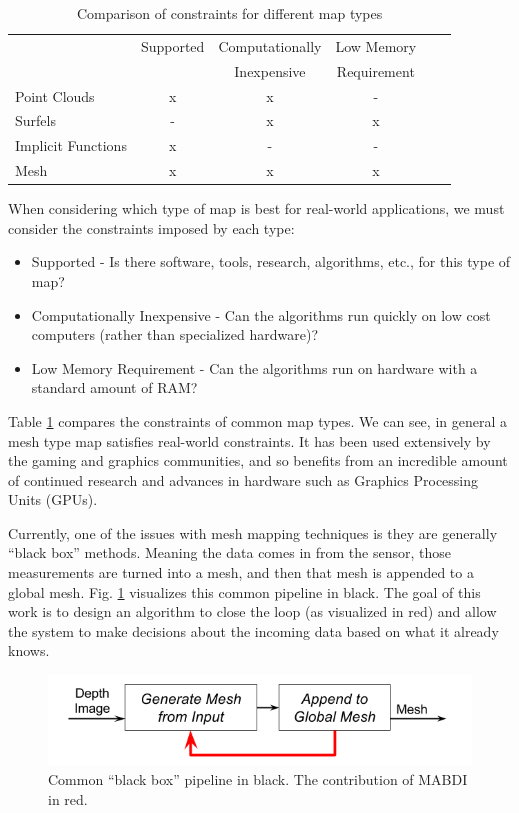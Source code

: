 \begin{table}[h]
  \caption{Comparison of constraints for different map types}
  \label{tab:rep}
  \begin{footnotesize}
  \begin{center}
    \vspace{-10pt}
    \begin{tabular}{|l|c|c|c|c|c|}
    \hline
    \multirow{2}{*}{} & Supported & Computationally & Low Memory \\
     & & Inexpensive & Requirement \\\hline
    Point Clouds		& x & x & - \\
    Surfels             	& - & x & x \\
    Implicit Functions 	& x & - & - \\
    Mesh	 	& x & x & x \\
    \hline
    \end{tabular}
  \end{center}
  \end{footnotesize}
\end{table}

When considering which type of map is best for real-world applications, we must
consider the constraints imposed by each type:

\begin{itemize}
  \item Supported - Is there software, tools, research, algorithms, etc., for
  this type of map?
  \item Computationally Inexpensive - Can the algorithms run quickly on low cost
  computers (rather than specialized hardware)?
  \item Low Memory Requirement - Can the algorithms run on hardware with
  a standard amount of RAM?
\end{itemize}

Table \ref{tab:rep} compares the constraints of common map types. We can see, in
general a mesh type map satisfies real-world constraints. It has been used
extensively by the gaming and graphics communities, and so benefits from an
incredible amount of continued research and advances in hardware such as
Graphics Processing Units (GPUs).

Currently, one of the issues with mesh mapping techniques is they are generally
``black box'' methods. Meaning the data comes in from the sensor, those
measurements are turned into a mesh, and then that mesh is appended to a global
mesh. Fig. \ref{fig:pipeline} visualizes this common pipeline in black. The goal
of this work is to design an algorithm to close the loop (as visualized in red)
and allow the system to make decisions about the incoming data based on what it
already knows.

\begin{figure}[h]%
\centering
\includegraphics[width=.5\textwidth]{figures/diagram_general_pipeline.png}
\caption{Common ``black box'' pipeline in black. The contribution of MABDI in red.}
\label{fig:pipeline}
\end{figure}
